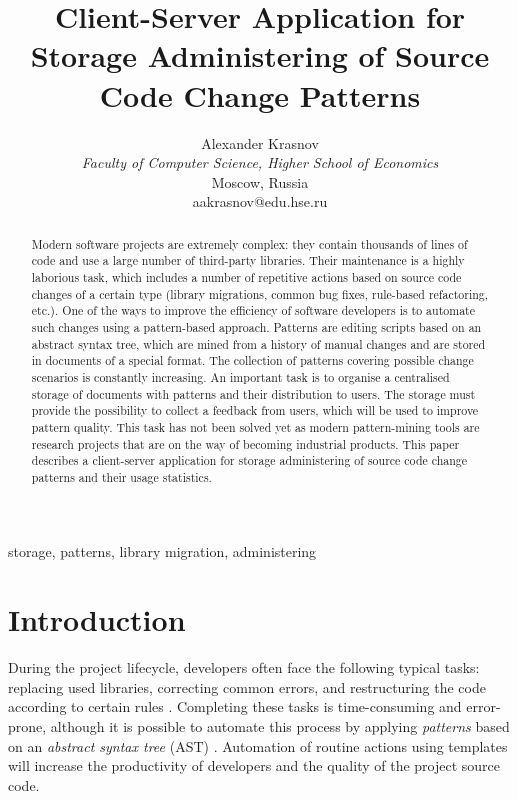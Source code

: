 \documentclass[letterpaper, 10 pt, conference]{ieeeconf}  %
\title{\LARGE \bf
Client-Server Application for Storage Administering of Source Code Change Patterns
}
\author{
Alexander Krasnov \\ 
\textit{Faculty of Computer Science, Higher School of Economics} \\
Moscow, Russia \\
aakrasnov@edu.hse.ru
}
\begin{document}
\maketitle
\thispagestyle{empty}
\pagestyle{empty}

\begin{abstract}

Modern software projects are extremely complex: they contain thousands of lines
of code and use a large number of third-party libraries.
Their maintenance is a highly laborious task, which includes a number of
repetitive actions based on source code changes of a certain type (library
migrations, common bug fixes, rule-based refactoring, etc.).
One of the ways to improve the efficiency of software developers is to
automate such changes using a pattern-based approach. 
Patterns are editing scripts based on an abstract syntax tree, which are 
mined from a history of manual changes and are stored in documents of a 
special format. 
The collection of patterns covering possible change scenarios is constantly
increasing.
An important task is to organise a centralised storage of documents with
patterns and their distribution to users. 
The storage must provide the possibility to collect a feedback from users, 
which will be used to improve pattern quality. 
This task has not been solved yet as modern pattern-mining tools are research
projects that are on the way of becoming industrial products.
This paper describes a client-server application for storage administering of
source code change patterns and their usage statistics.
\end{abstract}

\begin{keywords} 
storage, patterns, library migration, administering
\end{keywords}


\section{Introduction}
During the project lifecycle, developers often face the following
typical tasks: replacing used libraries, correcting common errors,
and restructuring the code according to certain rules \cite{c4}. 
Completing these tasks is time-consuming and error-prone, although it is
possible to automate this process by applying \emph{patterns} based on an
\emph{abstract syntax tree} (AST) \cite{c1, c2, c3}. 
Automation of routine actions using templates will increase the productivity of
developers and the quality of the project source code.
\end{document}
